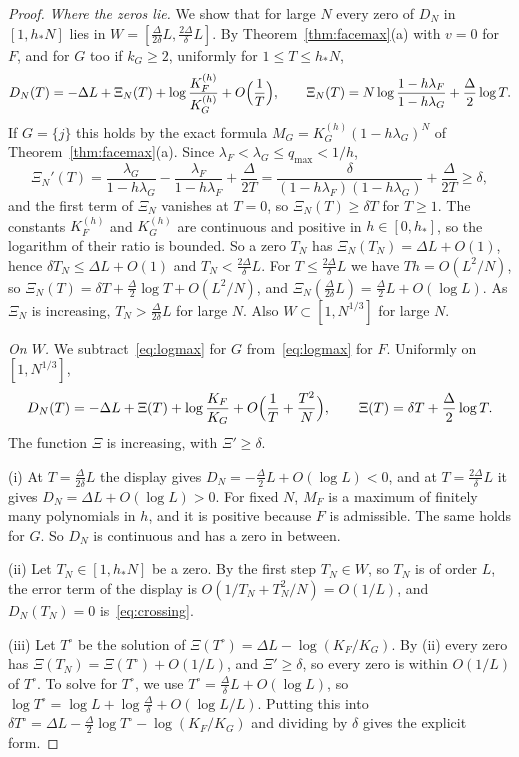 \begin{proof}
\emph{Where the zeros lie.} We show that for large $N$ every zero of $D_N$ in
$[1,h_*N]$ lies in $W=[\frac\Delta{2\delta}L,\frac{2\Delta}\delta L]$. By
Theorem~\ref{thm:facemax}(a) with $v=0$ for $F$, and for $G$ too if $k_G\ge2$,
uniformly for $1\le T\le h_*N$,
\[
D_N(T)=-\Delta L+\Xi_N(T)+\log\frac{K^{(h)}_F}{K^{(h)}_G}+O\Bigl(\frac1T\Bigr),
\qquad\Xi_N(T)=N\log\frac{1-h\lambda_F}{1-h\lambda_G}+\frac\Delta2\log T .
\]
If $G=\{j\}$ this holds by the exact formula $M_G=K^{(h)}_G(1-h\lambda_G)^N$ of
Theorem~\ref{thm:facemax}(a). Since $\lambda_F<\lambda_G\le q_{\max}<1/h$,
\[
\Xi_N'(T)=\frac{\lambda_G}{1-h\lambda_G}-\frac{\lambda_F}{1-h\lambda_F}+\frac\Delta{2T}
=\frac\delta{(1-h\lambda_F)(1-h\lambda_G)}+\frac\Delta{2T}\ge\delta,
\]
and the first term of $\Xi_N$ vanishes at $T=0$, so $\Xi_N(T)\ge\delta T$ for $T\ge1$.
The constants $K^{(h)}_F$ and $K^{(h)}_G$ are continuous and positive in
$h\in[0,h_*]$, so the logarithm of their ratio is bounded. So a zero $T_N$ has
$\Xi_N(T_N)=\Delta L+O(1)$, hence $\delta T_N\le\Delta L+O(1)$ and
$T_N<\frac{2\Delta}\delta L$. For $T\le\frac{2\Delta}\delta L$ we have $Th=O(L^2/N)$,
so $\Xi_N(T)=\delta T+\frac\Delta2\log T+O(L^2/N)$, and
$\Xi_N(\frac\Delta{2\delta}L)=\frac\Delta2L+O(\log L)$. As $\Xi_N$ is increasing,
$T_N>\frac\Delta{2\delta}L$ for large $N$. Also $W\subset[1,N^{1/3}]$ for large $N$.

\emph{On $W$.} We subtract~\eqref{eq:logmax} for $G$ from~\eqref{eq:logmax} for $F$.
Uniformly on $[1,N^{1/3}]$,
\[
D_N(T)=-\Delta L+\Xi(T)+\log\frac{K_F}{K_G}+O\Bigl(\frac1T+\frac{T^2}N\Bigr),
\qquad\Xi(T)=\delta T+\frac\Delta2\log T .
\]
The function $\Xi$ is increasing, with $\Xi'\ge\delta$.

(i) At $T=\frac{\Delta}{2\delta}L$ the display gives $D_N=-\frac\Delta2L+O(\log L)<0$, and at
$T=\frac{2\Delta}\delta L$ it gives $D_N=\Delta L+O(\log L)>0$. For fixed $N$, $M_F$ is a maximum
of finitely many polynomials in $h$, and it is positive because $F$ is admissible. The same holds
for $G$. So $D_N$ is continuous and has a zero in between.

(ii) Let $T_N\in[1,h_*N]$ be a zero. By the first step $T_N\in W$, so $T_N$ is of
order $L$, the error term of the display is $O(1/T_N+T_N^2/N)=O(1/L)$, and
$D_N(T_N)=0$ is~\eqref{eq:crossing}.

(iii) Let $T^\circ$ be the solution of $\Xi(T^\circ)=\Delta L-\log(K_F/K_G)$. By (ii) every zero
has $\Xi(T_N)=\Xi(T^\circ)+O(1/L)$, and $\Xi'\ge\delta$, so every zero is within $O(1/L)$ of
$T^\circ$. To solve for $T^\circ$, we use $T^\circ=\frac\Delta\delta L+O(\log L)$, so
$\log T^\circ=\log L+\log\frac\Delta\delta+O(\log L/L)$. Putting this into
$\delta T^\circ=\Delta L-\frac\Delta2\log T^\circ-\log(K_F/K_G)$ and dividing by $\delta$ gives
the explicit form.


\end{proof}
